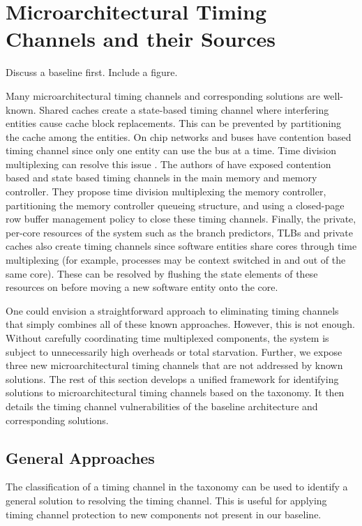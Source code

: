\section{Microarchitectural Timing Channels and their Sources}
Discuss a baseline first. Include a figure.


Many microarchitectural timing channels and corresponding solutions are 
well-known. Shared caches create a state-based timing channel where interfering 
entities cause cache block replacements. This can be prevented by partitioning 
the cache among the entities. On chip networks and buses have contention based 
timing channel since only one entity can use the bus at a time. Time division 
multiplexing can resolve this issue \cite{yaonocs}. The authors of 
\cite{ushpca14} have exposed contention based and state based timing channels 
in the main memory and memory controller. They propose time division 
multiplexing the memory controller, partitioning the memory controller queueing 
structure, and using a closed-page row buffer management policy to close these 
timing channels. Finally, the private, per-core resources of the system such as 
the branch predictors, TLBs and private caches also create timing channels 
since software entities share cores through time multiplexing (for example, 
processes may be context switched in and out of the same core). These can be 
resolved by flushing the state elements of these resources on before moving a 
new software entity onto the core.

One could envision a straightforward approach to eliminating 
timing channels that simply combines all of these known approaches. However, 
this is not enough. Without carefully coordinating time multiplexed components, 
the system is subject to unnecessarily high overheads or total starvation.  
Further, we expose three new microarchitectural timing channels that are not 
addressed by known solutions. The rest of this section develops a unified 
framework for identifying solutions to microarchitectural timing channels based 
on the taxonomy. It then details the timing channel vulnerabilities of the 
baseline architecture and corresponding solutions.

\subsection{General Approaches}
The classification of a timing channel in the taxonomy can be used to identify 
a general solution to resolving the timing channel. This is useful for 
applying timing channel protection to new components not 
present in our baseline. 

